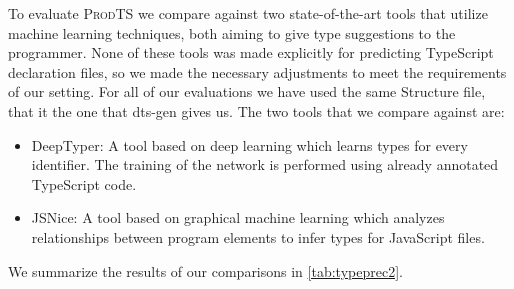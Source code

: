 \documentclass[sigplan,10pt,anonymous]{acmart} %
\newcommand{\prodts}{\textsc{ProdTS}\xspace}
\theoremstyle{plain}
\theoremstyle{remark}
\theoremstyle{definition}
\begin{document}
To evaluate \prodts we compare against two state-of-the-art tools that utilize machine learning techniques, both aiming to give type suggestions to the programmer.
None of these tools was made explicitly for predicting TypeScript declaration files, so we made the necessary adjustments to meet the requirements of our setting.
For all of our evaluations we have used the same Structure file, that it the one that dts-gen gives us.
The two tools that we compare against are:
\begin{itemize}[label={\tiny$\bullet$}]
  \item DeepTyper: A tool based on deep learning which learns types for every identifier.
        The training of the network is performed using already annotated TypeScript code.

  \item JSNice: A tool based on graphical machine learning which analyzes relationships between program elements to infer types for JavaScript files.
\end{itemize}
We summarize the results of our comparisons in \cref{tab:typeprec2}.
\end{document}
